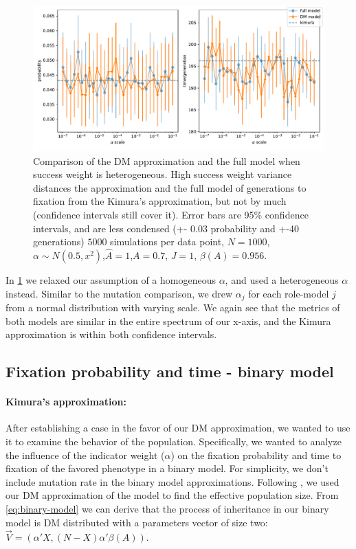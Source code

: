 \documentclass[11pt]{article}
\begin{document}
\begin{figure}
    \includegraphics[width=\linewidth]{../figures/binary/full_vs_dm_changing_alpha.pdf}
  \caption{Comparison of the DM approximation and the full model when success weight is heterogeneous. High success weight variance distances the approximation and the full model of generations to fixation from the Kimura's approximation, but not by much (confidence intervals still cover it). Error bars are 95\% confidence intervals, and are less condensed (+- 0.03 probability and +-40 generations)
  $5000$ simulations per data point, $N=1000$, $\alpha\sim N(0.5,x^2)$,$\hat{A}=1$,$A=0.7$, $J=1$, $\beta(A)=0.956$.}	
  \label{fig:hetro_alpha}
\end{figure}

In \cref{fig:hetro_alpha} we relaxed our assumption of a homogeneous $\alpha$, and used a heterogeneous $\alpha$ instead. Similar to the mutation comparison, we drew $\alpha_j$ for each role-model $j$ from a normal distribution with varying scale. We again see that the metrics of both models are similar in the entire spectrum of our x-axis, and the Kimura approximation is within both confidence intervals.

\subsection{Fixation probability and time - binary model}
\paragraph{Kimura's approximation:}
After establishing a case in the favor of our DM approximation, we wanted to use it to examine the behavior of the population. Specifically, we wanted to analyze the influence of the indicator weight ($\alpha$) on the fixation probability and time to fixation of the favored phenotype in a binary model.
For simplicity, we don't include mutation rate in the binary model approximations.
Following \citet{durret}, we used our DM approximation of the model to find the effective population size. From \cref{eq:binary-model} we can derive that the process of inheritance in our binary model is DM distributed with a parameters vector of size two: $\vec{V}=(\alpha'X,(N-X)\alpha'\beta(A))$.
\end{document}

